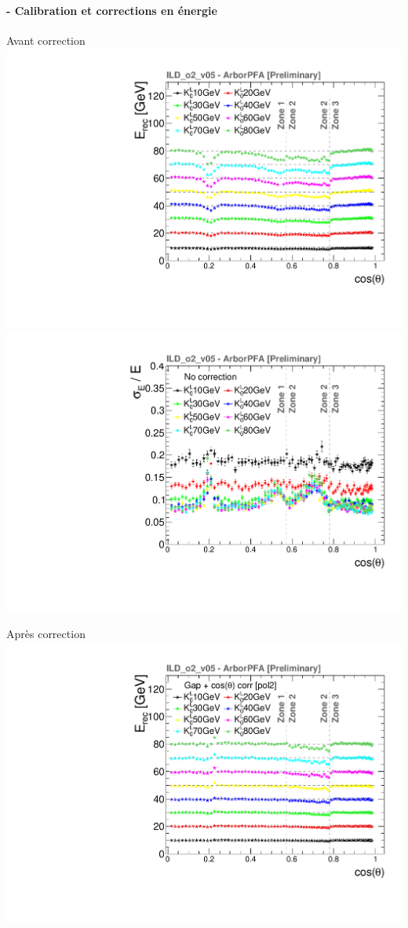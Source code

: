 \documentclass[8pt]{beamer}
\begin{document}
  \begin{frame}
  \frametitle{\secname}
  \framesubtitle{\subsecname - Calibration et corrections en énergie}
    \begin{minipage}{0.49\linewidth}
      \begin{center}
        Avant correction \includegraphics[width=0.75\linewidth]{ERec_thesis.pdf} \\
        \includegraphics[width=0.75\linewidth]{ERes_thesis.pdf}
      \end{center}
    \end{minipage} \hfill
    \begin{minipage}{0.49\linewidth}
      \begin{center}
        Après correction \includegraphics[width=0.75\linewidth]{ERecCorrThetaGapO2_thesis.pdf} \\

\end{center}
\end{minipage}
\end{frame}
\end{document}
